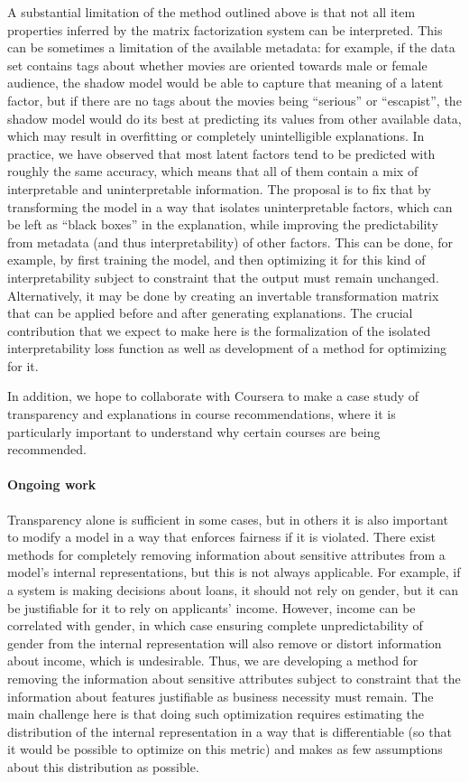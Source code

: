 A substantial limitation of the method outlined above is that not all
item properties inferred by the matrix factorization system can be interpreted.
This can be sometimes a limitation of the available metadata: for example,
if the data set contains tags about whether movies are oriented towards male or
female audience, the shadow model would be able to capture that meaning of a
latent factor, but if there are no tags about the movies being ``serious'' or
``escapist'', the shadow model would do its best at predicting its values from
other available data, which may result in overfitting or completely
unintelligible explanations. In practice, we have observed that most latent
factors tend to be predicted with roughly the same accuracy, which means that
all of them contain a mix of interpretable and uninterpretable information. The
proposal is to fix that by transforming the model in a way that isolates
uninterpretable factors, which can be left as ``black boxes'' in the
explanation, while improving the predictability from metadata (and thus
interpretability) of other factors. This can be done, for example, by first
training the model, and then optimizing it for this kind of interpretability
subject to constraint that the output must remain unchanged. Alternatively, it
may be done by creating an invertable transformation matrix that can be applied
before and after generating explanations. The crucial contribution that we
expect to make here is the formalization of the isolated interpretability loss
function as well as development of a method for optimizing for it.

In addition, we hope to collaborate with Coursera to make a case study of
transparency and explanations in course recommendations, where it is
particularly important to understand why certain courses are being recommended.

\paragraph{Ongoing work}

Transparency alone is sufficient in some cases, but in others it is also
important to modify a model in a way that enforces fairness if it is violated.
There exist methods for completely removing information about sensitive
attributes from a model's internal representations\cite{Beutel2017DataDA}, but
this is not always applicable. For example, if a system is making decisions
about loans, it should not rely on gender, but it can be justifiable for it to
rely on applicants' income. However, income can be correlated with gender, in
which case ensuring complete unpredictability of gender from the internal
representation will also remove or distort information about income, which is
undesirable. Thus, we are developing a method for removing the information
about sensitive attributes subject to constraint that the information about
features justifiable as business necessity must remain. The main challenge here
is that doing such optimization requires estimating the distribution of the
internal representation in a way that is differentiable (so that it would be
possible to optimize on this metric) and makes as few assumptions about this
distribution as possible.

